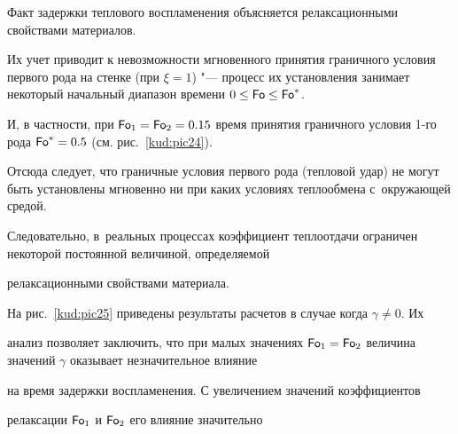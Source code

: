\begin{figure}[p!]
\begin{tabular}{lp{4.8cm}}




\\

\end{tabular}



\end{figure}



Факт задержки теплового воспламенения объясняется релаксационными свойствами материалов. 

Их учет приводит к невозможности мгновенного принятия граничного условия первого рода на стенке (при $\xi =1$) "--- процесс их установления занимает некоторый начальный диапазон времени $0\le \operatorname{\sf Fo}\le

\operatorname{\sf Fo}^\ast $. 

И, в частности, при $\operatorname{\sf Fo}_ 1 =\operatorname{\sf Fo}_2 =0.15$ время принятия граничного условия 1-го рода $\operatorname{\sf Fo}^\ast =0.5$ (см. рис.~\ref{kud:pic24}). 

Отсюда следует, что граничные условия первого рода (тепловой удар) не могут быть установлены мгновенно ни при каких условиях теплообмена с~окружающей средой. 

Следовательно, в~реальных процессах коэффициент теплоотдачи ограничен некоторой постоянной величиной, определяемой

релаксационными свойствами материала.



На рис.~\ref{kud:pic25} приведены результаты расчетов в случае когда $\gamma \ne 0$. Их

анализ позволяет заключить, что при малых значениях $\operatorname{\sf Fo}_1

=\operatorname{\sf Fo}_2 $ величина значений $\gamma $ оказывает незначительное влияние

на время задержки воспламенения. С увеличением значений коэффициентов

релаксации $\operatorname{\sf Fo}_1 $ и $\operatorname{\sf Fo}_2 $ его влияние значительно


